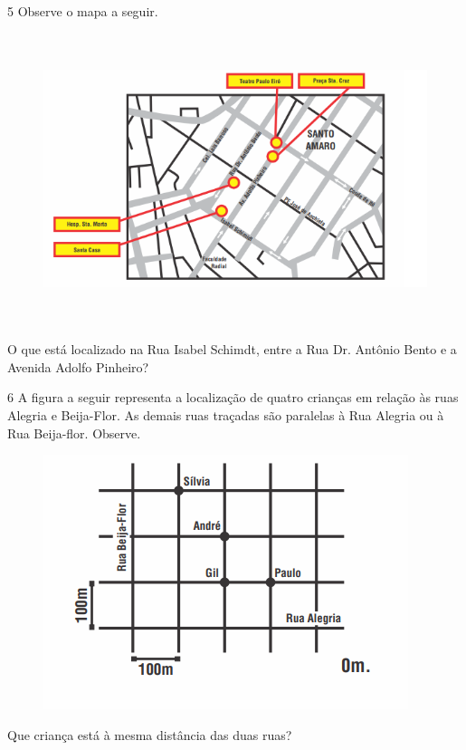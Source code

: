 \num{5}  Observe o mapa a seguir.

\begin{figure}[H]
\centering\includegraphics[width=5.90625in,height=3.34375in]{./imgSAEB_6_MAT/media/image68.png}
\end{figure}

O que está localizado na Rua Isabel Schimdt, entre a Rua Dr. Antônio Bento e a Avenida
Adolfo Pinheiro?


\num{6}  A figura a seguir representa a localização de quatro crianças em relação às
ruas Alegria e Beija-Flor. As demais ruas traçadas são paralelas à Rua
Alegria ou à Rua Beija-flor. Observe.

\begin{figure}[H]
\centering\includegraphics[width=4.19792in,height=2.93056in]{./imgSAEB_6_MAT/media/image69.png}
\end{figure}

Que criança está à mesma distância das duas ruas?

